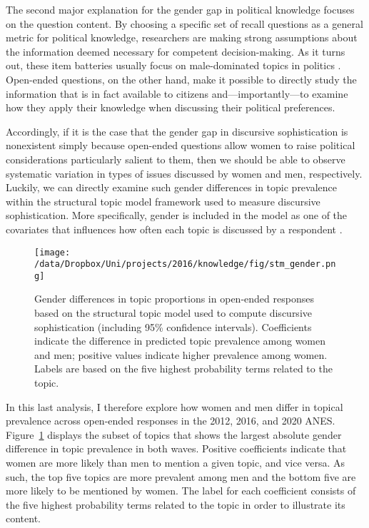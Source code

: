 The second major explanation for the gender gap in political knowledge focuses on the question content. By choosing a specific set of recall questions as a general metric for political knowledge, researchers are making strong assumptions about the information deemed necessary for competent decision-making. As it turns out, these item batteries usually focus on male-dominated topics in politics \citep{dolan2011women}. Open-ended questions, on the other hand, make it possible to directly study the information that is in fact available to citizens and---importantly---to examine how they apply their knowledge when discussing their political preferences.

Accordingly, if it is the case that the gender gap in discursive sophistication is nonexistent simply because open-ended questions allow women to raise political considerations particularly salient to them, then we should be able to observe systematic variation in types of issues discussed by women and men, respectively. Luckily, we can directly examine such gender differences in topic prevalence within the structural topic model framework used to measure discursive sophistication. More specifically, gender is included in the model as one of the covariates that influences how often each topic is discussed by a respondent \citep[see also][for details]{roberts2014structural}.

\begin{figure}[ht]\centering
\texttt{[image: /data/Dropbox/Uni/projects/2016/knowledge/fig/stm\_gender.png]}
\caption[Gender differences in topic proprtions in open-ended responses]{Gender differences in topic proportions in open-ended responses based on the structural topic model used to compute discursive sophistication (including 95\% confidence intervals). Coefficients indicate the difference in predicted topic prevalence among women and men; positive values indicate higher prevalence among women. Labels are based on the five highest probability terms related to the topic.
}\label{fig:stm_gender}
\end{figure}

In this last analysis, I therefore explore how women and men differ in topical prevalence across open-ended responses in the 2012, 2016, and 2020 ANES. Figure~\ref{fig:stm_gender} displays the subset of topics that shows the largest absolute gender difference in topic prevalence in both waves. Positive coefficients indicate that women are more likely than men to mention a given topic, and vice versa. As such, the top five topics are more prevalent among men and the bottom five are more likely to be mentioned by women. The label for each coefficient consists of the five highest probability terms related to the topic in order to illustrate its content.

